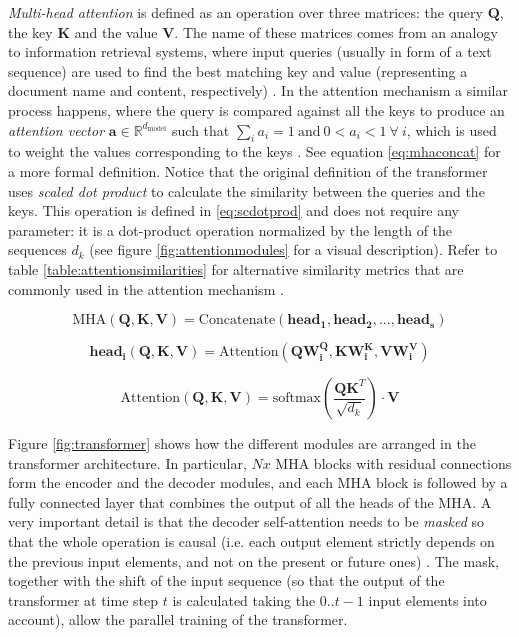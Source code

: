  \textit{Multi-head attention} is defined as an operation over three matrices: the query $\mathbf{Q}$, the key $\mathbf{K}$ and the value $\mathbf{V}$. The name of these matrices comes from an analogy to information retrieval systems, where input queries (usually in form of a text sequence) are used to find the best matching key and value (representing a document name and content, respectively) \autocite{manning2008}. In the attention mechanism a similar process happens, where the query is compared against all the keys to produce an \textit{attention vector} $\mathbf{a} \in \mathbb{R}^{d_{\mathrm{model}}}$ such that $\sum_{i} a_i = 1\ \mathrm{and}\ 0<a_i<1\ \forall\ i$, which is used to weight the values corresponding to the keys \autocite{vaswani2017}. See equation \ref{eq:mhaconcat} for a more formal definition. Notice that the original definition of the transformer \autocite{vaswani2017} uses \textit{scaled dot product}  to calculate the similarity between the queries and the keys. This operation is defined in \ref{eq:scdotprod} and does not require any parameter: it is a dot-product operation normalized by the length of the sequences $d_k$ (see figure \ref{fig:attentionmodules} for a visual description). Refer to table \ref{table:attentionsimilarities} for alternative similarity metrics that are commonly used in the attention mechanism \autocite{uday2019}.

 \begin{equation}
 \label{eq:mhaconcat}
 \mathrm{MHA}(\mathbf{Q, K, V}) = \mathrm{Concatenate}(\mathrm{\mathbf{head_1}},\mathrm{\mathbf{head_2}},...,\mathrm{\mathbf{head_s}})
 \end{equation}


 \begin{equation}
 \label{eq:headsdef}
 \mathrm{\mathbf{head_i}}(\mathbf{Q,K,V}) = \mathrm{Attention}(\mathbf{Q} \mathbf{W^Q_i}, \mathbf{K} \mathbf{W^K_i}, \mathbf{V} \mathbf{W^V_i})
 \end{equation}

 \begin{equation}
 \label{eq:scdotprod}
 \mathrm{Attention}(\mathbf{Q, K, V}) = \mathrm{softmax} \left(\frac{\mathbf{QK}^T}{\sqrt{d_k}}\right) \cdot \mathbf{V}
 \end{equation}



Figure \ref{fig:transformer} shows how the different modules are arranged in the transformer architecture. In particular, $Nx$ MHA blocks with residual connections form the encoder and the decoder modules, and each MHA block is followed by a fully connected layer that combines the output of all the heads of the MHA. A very important detail is that the decoder self-attention needs to be \textit{masked} so that the whole operation is causal (i.e. each output element strictly depends on the previous input elements, and not on the present or future ones) \autocite{vaswani2017}. The mask, together with the shift of the input sequence (so that the output of the transformer at time step $t$ is calculated taking the $0..t-1$ input elements into account), allow the parallel training of the transformer.

